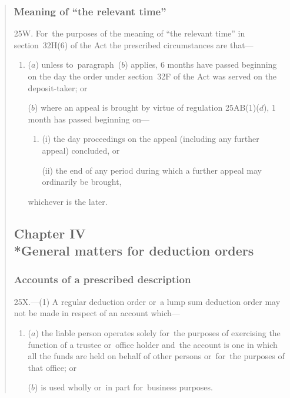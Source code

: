 \documentclass[12pt,a4paper]{article}
\begin{document}
\begin{quotation}
\subsubsection*{Meaning of “the relevant time”}

25W.  For~the purposes of the meaning of “the relevant time” in section~32H(6) of the Act the prescribed circumstances are that—
\begin{enumerate}\item[]
($a$) unless to~paragraph~($b$)  applies, 6 months have passed beginning on the day the order under section~32F of the Act was served on the deposit-taker; or

\begin{sloppypar}
($b$) where an appeal is brought by virtue of regulation 25AB(1)($d$), 1 month has passed beginning on—
\end{sloppypar}
\begin{enumerate}\item[]
(i) the day proceedings on the appeal (including any further appeal) concluded, or

(ii) the end of any period during which a further appeal may ordinarily be brought,
\end{enumerate}
whichever is the later.
\end{enumerate}

\subsection*{Chapter IV\\*General matters for deduction orders}

\subsubsection*{Accounts of a prescribed description}

25X.---(1)  A regular deduction order or~a lump sum deduction order may not be made in respect of an account which—
\begin{enumerate}\item[]
($a$) the liable person operates solely for~the purposes of exercising the function of a trustee or~office holder and~the account is one in which all the funds are held on behalf of other persons or~for~the purposes of that office; or

($b$) is used wholly or~in part for~business purposes.
\end{enumerate}


\end{quotation}
\end{document}
